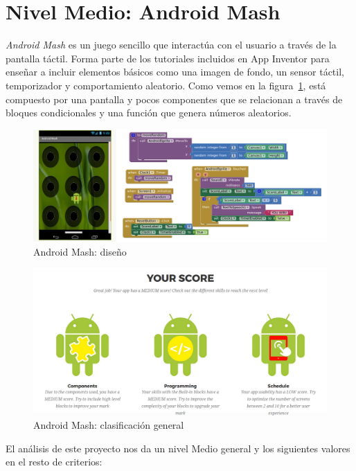 \documentclass[a4paper, 12pt]{book}
\begin{document}
\section{Nivel Medio: Android Mash} 
\textit{Android Mash} es un juego sencillo que interactúa con el usuario a través de la pantalla táctil. Forma parte de los tutoriales incluidos en App Inventor para enseñar a incluir elementos básicos como una imagen de fondo, un sensor táctil, temporizador y comportamiento aleatorio. 
Como vemos en la figura~\ref{fig:AndroidMash}, está compuesto por una pantalla y pocos componentes que se relacionan a través de bloques condicionales y una función que genera números aleatorios. 
\begin{figure}[H]
  \centering
  \includegraphics[width=\linewidth, keepaspectratio]{img/AndroidMash}
  \caption{Android Mash: diseño}
  \label{fig:AndroidMash}
\end{figure}
\begin{figure}[H]
  \centering
  \includegraphics[width=\linewidth, keepaspectratio]{img/AndroidMashGlobal}
  \caption{Android Mash: clasificación general}
  \label{fig:AndroidMashGlobal}
\end{figure}
El análisis de este proyecto nos da un nivel Medio general y los siguientes valores en el resto de criterios:
\end{document}
